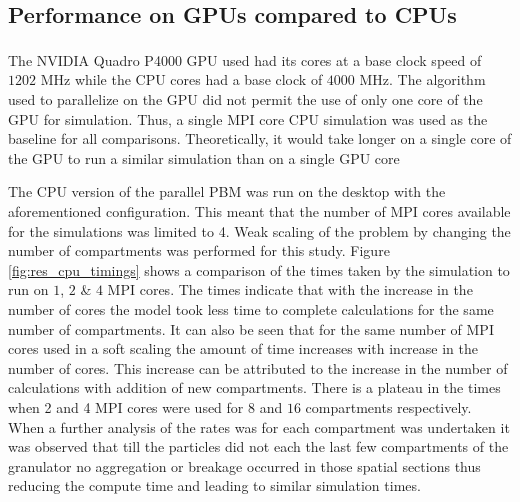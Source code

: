 \documentclass[review]{elsarticle}
\begin{document}
\begin{linenumbers}
\subsection{Performance on GPUs compared to CPUs}
The NVIDIA\textsuperscript{\tiny\textregistered} Quadro P4000 GPU used 
had its cores at a base clock speed of $1202$ MHz while
the CPU cores had a base clock of $4000$ MHz. The algorithm used to parallelize on the GPU 
did not permit the use of only one core of the GPU for simulation. Thus, a single MPI core 
CPU simulation was used as the baseline for all comparisons. Theoretically, it would take 
longer on a single core of the GPU to run a similar simulation than on a single GPU core

The CPU version of the parallel PBM was run on the desktop with the aforementioned 
configuration. This meant that the number of MPI cores available for the simulations 
was limited to 4. Weak scaling of the problem by changing the number of compartments 
was performed for this study. Figure \ref{fig:res_cpu_timings} shows a comparison of the times taken 
by the simulation to run on $1$, $2$ \& $4$ MPI cores. The times indicate that 
with the increase in the number of cores the model took less time to complete 
calculations for the same number of compartments. It can also be seen that for the 
same number of MPI cores used in a soft scaling the amount of time increases 
with increase in the number of cores. This increase can be attributed to the 
increase in the number of calculations with addition of new compartments. There is a 
plateau in the times when 2 and 4 MPI cores were used for $8$ and $16$ compartments 
respectively. When a further analysis of the rates was for each compartment was undertaken 
it was observed that till the particles did not each the last few compartments of the 
granulator no aggregation or breakage occurred in those spatial sections thus reducing 
the compute time and leading to similar simulation times.


\end{linenumbers}
\end{document}

